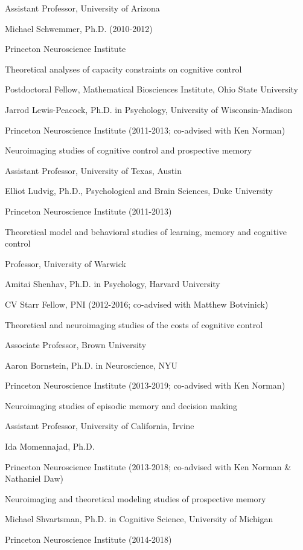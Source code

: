 \documentclass[10 pt]{article}
\begin{document}
Assistant Professor, University of Arizona
    \medskip

Michael Schwemmer, Ph.D. (2010-2012)

Princeton Neuroscience Institute

Theoretical analyses of capacity constraints on cognitive control

Postdoctoral Fellow, Mathematical Biosciences Institute, Ohio State University
    \medskip

Jarrod Lewis-Peacock, Ph.D. in Psychology, University of Wisconsin-Madison

Princeton Neuroscience Institute (2011-2013; co-advised with Ken Norman)

Neuroimaging studies of cognitive control and prospective memory

Assistant Professor, University of Texas, Austin
    \medskip

Elliot Ludvig, Ph.D., Psychological and Brain Sciences, Duke University

Princeton Neuroscience Institute (2011-2013)

Theoretical model and behavioral studies of learning, memory and cognitive control

Professor, University of Warwick
    \medskip

Amitai Shenhav, Ph.D. in Psychology, Harvard University

CV Starr Fellow, PNI (2012-2016; co-advised with Matthew Botvinick)

Theoretical and neuroimaging studies of the costs of cognitive control

Associate Professor, Brown University
    \medskip

Aaron Bornstein, Ph.D. in Neuroscience, NYU

Princeton Neuroscience Institute (2013-2019; co-advised with Ken Norman)

Neuroimaging studies of episodic memory and decision making

Assistant Professor, University of California, Irvine
    \medskip

Ida Momennajad, Ph.D.

Princeton Neuroscience Institute (2013-2018; co-advised with Ken Norman \& Nathaniel Daw)

Neuroimaging and theoretical modeling studies of prospective memory
    \medskip

Michael Shvartsman, Ph.D. in Cognitive Science, University of Michigan

Princeton Neuroscience Institute (2014-2018)
\end{document}
